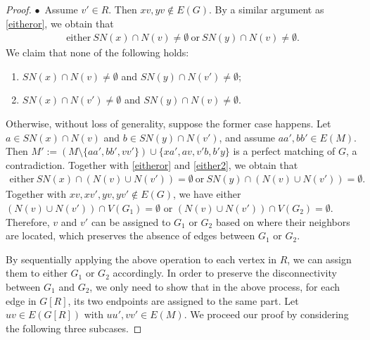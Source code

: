\documentclass[11pt, a4paper]{article}
\theoremstyle{definition}
\newcommand{\<}{\subseteq}
\begin{document}
\begin{proof}
$\bullet$\ Assume  $v'\in R$. Then $xv,yv\notin E(G)$. By a similar argument as \eqref{eitheror}, we obtain that
\begin{align}\label{either2}
    \text{either}\ SN(x)\cap N(v)\ne \emptyset\ \text{or}\ SN(y)\cap N(v)\ne \emptyset. 
\end{align}
We claim that 
none of the following holds:
\begin{enumerate}
    \item[{\rm (1)}] $SN(x)\cap N(v)\ne \emptyset$ and $SN(y)\cap N(v')\neq \emptyset$;
    \item[{\rm (2)}] $SN(x)\cap N(v')\ne\emptyset$ and $SN(y)\cap N(v)\ne \emptyset$. 
\end{enumerate}
Otherwise, without loss of generality, suppose the former case happens. Let $a\in SN(x)\cap N(v)$ and $b\in SN(y)\cap N(v')$, and assume  $aa',bb'\in E(M)$. Then $M':=(M\setminus\{aa',bb',vv'\})\cup \{xa',av,v'b,b'y\}$ is a perfect matching of $G$, a contradiction. Together with \eqref{eitheror} and \eqref{either2}, we obtain that 
\begin{align}\label{belong}
    \text{either}\ SN(x)\cap (N(v)\cup N(v'))= \emptyset\ \text{or}\ SN(y)\cap (N(v)\cup N(v'))= \emptyset.
\end{align}
Together with $xv,xv',yv,yv'\notin E(G)$, we have either $(N(v)\cup N(v'))\cap V(G_1)=\emptyset$ or $(N(v)\cup N(v'))\cap V(G_2)=\emptyset$. Therefore, $v$ and $v'$ can be assigned to $G_1$ or $G_2$ based on where their neighbors are located, which preserves the absence of edges between $G_1$ or $G_2$. %

By sequentially applying the above operation to each vertex in 
$R$, we can assign them to either 
$G_1$ or $G_2$ accordingly. In order to preserve the disconnectivity  between $G_1$ and $G_2$, we only need to show that in the above process, for each edge in $G[R]$, %
its two endpoints are assigned to the same part. Let $uv\in E(G[R])$ with $uu',vv'\in E(M)$. We proceed our proof by considering the following three subcases.





\end{proof}
\end{document}
